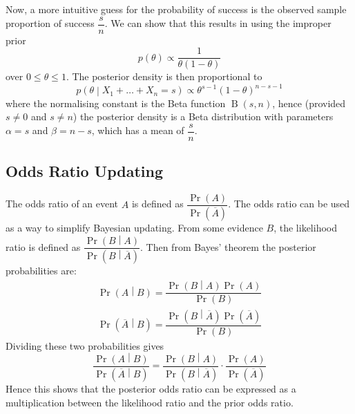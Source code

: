 \documentclass[11pt]{report} %
\begin{document}
Now, a more intuitive guess for the probability of success is the observed sample proportion of success $\dfrac{s}{n}$. We can show that this results in using the improper prior
\begin{equation}
p\left(\theta\right) \propto \dfrac{1}{\theta\left(1 - \theta\right)}
\end{equation}
over $0 \leq \theta \leq 1$. The posterior density is then proportional to
\begin{equation}
p\left(\theta\middle|X_{1} + \dots + X_{n} = s\right) \propto \theta^{s - 1}\left(1 - \theta\right)^{n - s - 1}
\end{equation}
where the normalising constant is the Beta function $\operatorname{B}\left(s, n\right)$, hence (provided $s \neq 0$ and $s \neq n$) the posterior density is a Beta distribution with parameters $\alpha = s$ and $\beta = n - s$, which has a mean of $\dfrac{s}{n}$.

\subsection{Odds Ratio Updating}

The odds ratio of an event $A$ is defined as $\dfrac{\operatorname{Pr}\left(A\right)}{\operatorname{Pr}\left(\overline{A}\right)}$. The odds ratio can be used as a way to simplify Bayesian updating. From some evidence $B$, the likelihood ratio is defined as $\dfrac{\operatorname{Pr}\left(B\middle|A\right)}{\operatorname{Pr}\left(B\middle|\overline{A}\right)}$. Then from Bayes' theorem the posterior probabilities are:
\begin{gather}
\operatorname{Pr}\left(A\middle|B\right) = \dfrac{\operatorname{Pr}\left(B\middle|A\right)\operatorname{Pr}\left(A\right)}{\operatorname{Pr}\left(B\right)} \\
\operatorname{Pr}\left(\overline{A}\middle|B\right) = \dfrac{\operatorname{Pr}\left(B\middle|\overline{A}\right)\operatorname{Pr}\left(\overline{A}\right)}{\operatorname{Pr}\left(B\right)}
\end{gather}
Dividing these two probabilities gives
\begin{equation}
\dfrac{\operatorname{Pr}\left(A\middle|B\right)}{\operatorname{Pr}\left(\overline{A}\middle|B\right)} = \dfrac{\operatorname{Pr}\left(B\middle|A\right)}{\operatorname{Pr}\left(B\middle|\overline{A}\right)}\cdot\dfrac{\operatorname{Pr}\left(A\right)}{\operatorname{Pr}\left(\overline{A}\right)}
\end{equation}
Hence this shows that the posterior odds ratio can be expressed as a multiplication between the likelihood ratio and the prior odds ratio.
\end{document}
